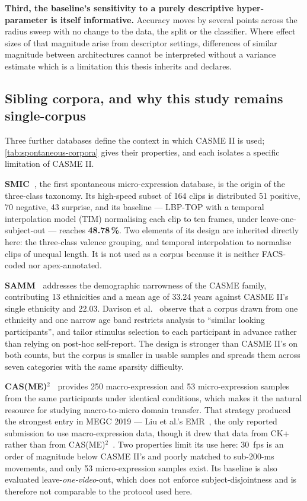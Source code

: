 \textbf{Third, the baseline's sensitivity to a purely descriptive hyper-parameter is itself informative.} Accuracy moves by several points across the radius sweep with no change to the data, the split or the classifier. Where effect sizes of that magnitude arise from descriptor settings, differences of similar magnitude between architectures cannot be interpreted without a variance estimate which is a limitation this thesis inherits and declares.

\subsection{Sibling corpora, and why this study remains single-corpus}
\label{sec:sibling-corpora}

Three further databases define the context in which CASME II is used; \autoref{tab:spontaneous-corpora} gives their properties, and each isolates a specific limitation of CASME II.

\textbf{SMIC~\cite{liX2013}}, the first spontaneous micro-expression database, is the origin of the three-class taxonomy. Its high-speed subset of 164 clips is distributed 51 positive, 70 negative, 43 surprise, and its baseline --- LBP-TOP with a temporal interpolation model (TIM) normalising each clip to ten frames, under leave-one-subject-out --- reaches \textbf{48.78\,\%}. Two elements of its design are inherited directly here: the three-class valence grouping, and temporal interpolation to normalise clips of unequal length. It is not used as a corpus because it is neither FACS-coded nor apex-annotated.

\textbf{SAMM~\cite{davison2018}} addresses the demographic narrowness of the CASME family, contributing 13 ethnicities and a mean age of 33.24 years against CASME II's single ethnicity and 22.03. Davison et al.~\cite{davison2018} observe that a corpus drawn from one ethnicity and one narrow age band restricts analysis to ``similar looking participants'', and tailor stimulus selection to each participant in advance rather than relying on post-hoc self-report. The design is stronger than CASME II's on both counts, but the corpus is smaller in usable samples and spreads them across seven categories with the same sparsity difficulty.

\textbf{CAS(ME)$^2$~\cite{qu2016}} provides 250 macro-expression and 53 micro-expression samples from the same participants under identical conditions, which makes it the natural resource for studying macro-to-micro domain transfer. That strategy produced the strongest entry in MEGC 2019 --- Liu et al.'s EMR~\cite{liu2019}, the only reported submission to use macro-expression data, though it drew that data from CK+ rather than from CAS(ME)$^2$~\cite{see2019}. Two properties limit its use here: 30~fps is an order of magnitude below CASME II's and poorly matched to sub-200-ms movements, and only 53 micro-expression samples exist. Its baseline is also evaluated leave-\textit{one-video}-out, which does not enforce subject-disjointness and is therefore not comparable to the protocol used here.

